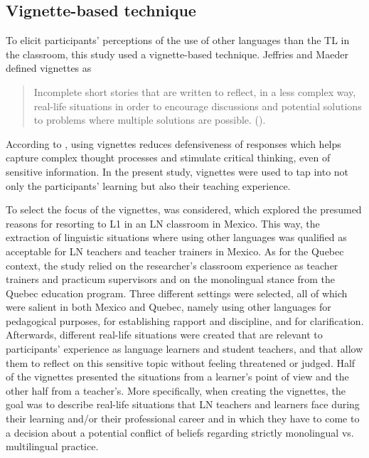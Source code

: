 \documentclass[output=paper]{../langscibook}
\begin{document}
\subsection{Vignette-based technique}
To elicit participants’ perceptions of the use of other languages than the TL in the classroom, this study used a vignette-based technique. Jeffries and Maeder defined vignettes as 

\begin{quote}
Incomplete short stories that are written to reflect, in a less complex way, real-life situations in order to encourage discussions and potential solutions to problems where multiple solutions are possible. (\citealt[18]{JeffriesMaeder2005}). 
\end{quote}

According to \citet{SimonTierney2011}, using vignettes reduces defensiveness of responses which helps capture complex thought processes and stimulate critical thinking, even of sensitive information. In the present study, vignettes were used to tap into not only the participants' learning but also their teaching experience. 

To select the focus of the vignettes, \citet{MoraPabloEtAl2011} was considered, which explored the presumed reasons for resorting to L1 in an LN classroom in Mexico. This way, the extraction of linguistic situations where using other languages was qualified as acceptable for LN teachers and teacher trainers in Mexico. As for the Quebec context, the study relied on the researcher’s classroom experience as teacher trainers and practicum supervisors and on the monolingual stance from the Quebec education program. Three different settings were selected, all of which were salient in both Mexico and Quebec, namely using other languages for pedagogical purposes, for establishing rapport and discipline, and for clarification. Afterwards, different real-life situations were created that are relevant to participants’ experience as language learners and student teachers, and that allow them to reflect on this sensitive topic without feeling threatened or judged. Half of the vignettes presented the situations from a learner’s point of view and the other half from a teacher’s. More specifically, when creating the vignettes, the goal was to describe real-life situations that LN teachers and learners face during their learning and/or their professional career and in which they have to come to a decision about a potential conflict of beliefs regarding strictly monolingual vs. multilingual practice.
\end{document}
